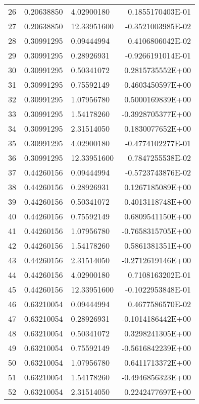 \begin{longtable}{@{\extracolsep{\fill}}cllr@{}}
26  &  0.20638850  &  4.02900180  &   0.1855170403E-01 \\
27  &  0.20638850  &  12.33951600  &  -0.3521003985E-02 \\
28  &  0.30991295  &  0.09444994  &   0.4106806042E-02 \\
29  &  0.30991295  &  0.28926931  &  -0.9266191014E-01 \\
30  &  0.30991295  &  0.50341072  &   0.2815735552E+00 \\
31  &  0.30991295  &  0.75592149  &  -0.4603450597E+00 \\
32  &  0.30991295  &  1.07956780  &   0.5000169839E+00 \\
33  &  0.30991295  &  1.54178260  &  -0.3928705377E+00 \\
34  &  0.30991295  &  2.31514050  &   0.1830077652E+00 \\
35  &  0.30991295  &  4.02900180  &  -0.4774102277E-01 \\
36  &  0.30991295  &  12.33951600  &   0.7847255538E-02 \\
37  &  0.44260156  &  0.09444994  &  -0.5723743876E-02 \\
38  &  0.44260156  &  0.28926931  &   0.1267185089E+00 \\
39  &  0.44260156  &  0.50341072  &  -0.4013118748E+00 \\
40  &  0.44260156  &  0.75592149  &   0.6809541150E+00 \\
41  &  0.44260156  &  1.07956780  &  -0.7658315705E+00 \\
42  &  0.44260156  &  1.54178260  &   0.5861381351E+00 \\
43  &  0.44260156  &  2.31514050  &  -0.2712619146E+00 \\
44  &  0.44260156  &  4.02900180  &   0.7108163202E-01 \\
45  &  0.44260156  &  12.33951600  &  -0.1022953848E-01 \\
46  &  0.63210054  &  0.09444994  &   0.4677586570E-02 \\
47  &  0.63210054  &  0.28926931  &  -0.1014186442E+00 \\
48  &  0.63210054  &  0.50341072  &   0.3298241305E+00 \\
49  &  0.63210054  &  0.75592149  &  -0.5616842239E+00 \\
50  &  0.63210054  &  1.07956780  &   0.6411713372E+00 \\
51  &  0.63210054  &  1.54178260  &  -0.4946856323E+00 \\
52  &  0.63210054  &  2.31514050  &   0.2242477697E+00 \\

\end{longtable}
